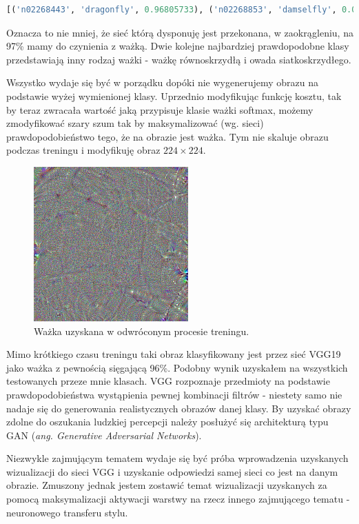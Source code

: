 \label{lst:wazka-prediction-result}
\begin{lstlisting}[language=Python, caption={Wynik skryptu \ref{lst:wazka-prediction}.}, captionpos=b]
[('n02268443', 'dragonfly', 0.96805733), ('n02268853', 'damselfly', 0.01810956), ('n02264363', 'lacewing', 0.012446008)]
\end{lstlisting}

Oznacza to nie mniej, że sieć którą dysponuję jest przekonana, w zaokrągleniu, na 97\% mamy do czynienia z ważką. Dwie kolejne najbardziej prawdopodobne klasy przedstawiają inny rodzaj ważki - ważkę równoskrzydłą i owada siatkoskrzydłego.

Wszystko wydaje się być w porządku dopóki nie wygenerujemy obrazu na podstawie wyżej wymienionej klasy. Uprzednio modyfikując funkcję kosztu, tak by teraz zwracała wartość jaką przypisuje klasie ważki softmax, możemy zmodyfikować szary szum tak by maksymalizować (wg. sieci) prawdopodobieństwo tego, że na obrazie jest ważka. Tym nie skaluje obrazu podczas treningu i modyfikuję obraz \(224 \times 224\).

\begin{figure}[ht]
\centerline{\includegraphics[scale=0.8]{resources/vgg_mean_topincluded/dragonfly-fake.png}}
\caption{Ważka uzyskana w odwróconym procesie treningu.}
\label{fig:wazka-fake}
\end{figure}

Mimo krótkiego czasu treningu taki obraz klasyfikowany jest przez sieć VGG19 jako ważka z pewnością sięgającą 96\%. Podobny wynik uzyskałem na wszystkich testowanych przeze mnie klasach. VGG rozpoznaje przedmioty na podstawie prawdopodobieństwa wystąpienia pewnej kombinacji filtrów - niestety samo nie nadaje się do generowania realistycznych obrazów danej klasy. 
By uzyskać obrazy zdolne do oszukania ludzkiej percepcji należy posłużyć się architekturą typu GAN (\textit{ang. Generative Adversarial Networks}).

Niezwykle zajmującym tematem wydaje się być próba wprowadzenia uzyskanych wizualizacji do sieci VGG i uzyskanie odpowiedzi samej sieci co jest na danym obrazie. 
Zmuszony jednak jestem zostawić temat wizualizacji uzyskanych za pomocą maksymalizacji aktywacji warstwy na rzecz innego zajmującego tematu - neuronowego transferu stylu.

